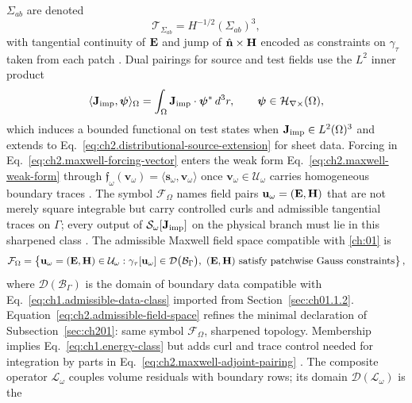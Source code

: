 \(\Sigma_{ab}\) are denoted
\begin{equation}
\label{eq:ch2.interface-trace-space}
\mathcal{T}_{\Sigma_{ab}}
=
H^{-1/2}(\Sigma_{ab})^{3},
\end{equation}
with tangential continuity of \(\mathbf{E}\) and jump of \(\hat{\mathbf{n}}\times\mathbf{H}\) encoded
as constraints on \(\gamma_\tau\) taken from each patch \cite{harrington2001}.
Dual pairings for source and test fields use the \(L^{2}\) inner product
\begin{equation}
\label{eq:ch2.dual-source-pairing}
\langle\mathbf{J}_{\mathrm{imp}},\boldsymbol{\psi}\rangle_{\Omega}
=
\int_\Omega \mathbf{J}_{\mathrm{imp}}\cdot\boldsymbol{\psi}^{*}\,d^{3}r,
\qquad
\boldsymbol{\psi}\in \mathcal{H}_{\nabla\times}(\Omega),
\end{equation}
which induces a bounded functional on test states when \(\mathbf{J}_{\mathrm{imp}}\in L^{2}(\Omega)^{3}\)
and extends to Eq.~\eqref{eq:ch2.distributional-source-extension} for sheet data.
Forcing in Eq.~\eqref{eq:ch2.maxwell-forcing-vector} enters the weak form
Eq.~\eqref{eq:ch2.maxwell-weak-form} through
\(\mathfrak{f}_\omega(\mathbf{v}_\omega)=\langle\mathbf{s}_\omega,\mathbf{v}_\omega\rangle\)
once \(\mathbf{v}_\omega\in\mathcal{U}_\omega\) carries homogeneous boundary traces
\cite{stratton1941}. The symbol \(\mathcal{F}_\Omega\) names field pairs
\(\mathbf{u}_\omega=(\mathbf{E},\mathbf{H})\) that are not merely square integrable but carry controlled
curls and admissible tangential traces on \(\Gamma\); every output of
\(\mathcal{S}_\omega[\mathbf{J}_{\mathrm{imp}}]\) on the physical branch must lie in this sharpened class
\cite{harrington2001}. The admissible Maxwell field space compatible with \ref{ch:01} is
\begin{equation}
\label{eq:ch2.admissible-field-space}
\mathcal{F}_\Omega
=
\left\{
\mathbf{u}_\omega=(\mathbf{E},\mathbf{H})\in\mathcal{U}_\omega:
\gamma_\tau[\mathbf{u}_\omega]\in\mathcal{D}\big(\mathcal{B}_\Gamma\big),\
(\mathbf{E},\mathbf{H})\ \text{satisfy patchwise Gauss constraints}
\right\},
\end{equation}
where \(\mathcal{D}(\mathcal{B}_\Gamma)\) is the domain of boundary data compatible
with Eq.~\eqref{eq:ch1.admissible-data-class} imported from
Section~\ref{sec:ch01.1.2}. Equation~\eqref{eq:ch2.admissible-field-space} refines
the minimal declaration of Subsection~\ref{sec:ch201}: same symbol
\(\mathcal{F}_\Omega\), sharpened topology. Membership implies
Eq.~\eqref{eq:ch1.energy-class} but adds curl and trace control needed for
integration by parts in Eq.~\eqref{eq:ch2.maxwell-adjoint-pairing}
\cite{stratton1941}. The composite operator $\mathcal{L}_\omega$ couples volume
residuals with boundary rows; its domain $\mathcal{D}(\mathcal{L}_\omega)$ is the
